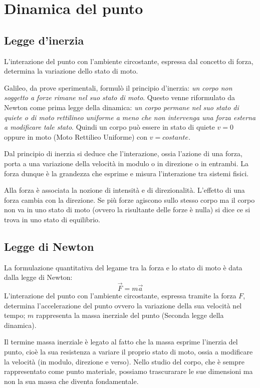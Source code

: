 \documentclass[class=book, crop=false, oneside, 12pt]{standalone}
\begin{document}
\chapter{Dinamica del punto}

\section{Legge d'inerzia}
L'interazione del punto con l'ambiente circostante, espressa dal concetto di forza, determina la variazione dello stato di moto.

Galileo, da prove sperimentali, formulò il principio d'inerzia: \emph{un corpo non soggetto a forze rimane nel suo stato di moto}. 
Questo venne riformulato da Newton come prima legge della dinamica: \emph{un corpo permane nel suo stato di quiete o di moto rettilineo uniforme a meno che non intervenga una forza esterna a modificare tale stato}. 
Quindi un corpo può essere in stato di quiete \(v = 0\) oppure in moto (Moto Rettilieo Uniforme) con \(v = costante\).

Dal principio di inerzia si deduce che l'interazione, ossia l'azione di una forza, porta a una variazione della velocità in modulo o in direzione o in entrambi.
La forza dunque è la grandezza che esprime e misura l'interazione tra sistemi fisici. 

Alla forza è associata la nozione di intensità e di direzionalità.
L'effetto di una forza cambia con la direzione. Se più forze agiscono sullo stesso corpo ma il corpo non va in uno stato di moto (ovvero la risultante delle forze è nulla) si dice ce si trova in uno stato di equilibrio.

\section{Legge di Newton }
La formulazione quantitativa del legame tra la forza e lo stato di moto è data dalla legge di Newton:
\begin{equation}
    \overrightarrow{F} = m \overrightarrow{a}
\end{equation}
L'interazione del punto con l'ambiente circostante, espressa tramite la forza \(F\), determina l'accelerazione del punto ovvero la variazione della sua velocità nel tempo; \(m\) rappresenta la massa inerziale del punto (Seconda legge della dinamica).

Il termine massa inerziale è legato al fatto che la massa esprime l'inerzia del punto, cioè la sua resistenza a variare il proprio stato di moto, ossia a modificare la velocità (in modulo, direzione e verso).
Nello studio del corpo, che è sempre rappresentato come punto materiale, possiamo trascurarare le sue dimensioni ma non la sua massa che diventa fondamentale.
\end{document}

